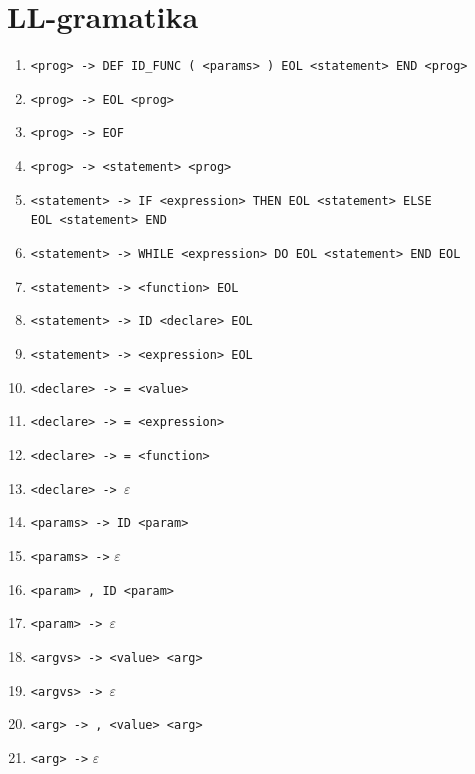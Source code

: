 \documentclass [11pt, a4paper]{article}
\begin{document}
\section{LL-gramatika}
\begin{table}[H]
	\centering
    \begin{enumerate}[noitemsep]
        \item \verb|<prog> -> DEF ID_FUNC ( <params> ) EOL <statement> END <prog>|
        \item \verb|<prog> -> EOL <prog>|
        \item \verb|<prog> -> EOF|
        \item \verb|<prog> -> <statement> <prog>|
        
        \item \verb|<statement> -> IF <expression> THEN EOL <statement> ELSE| \\ 
\verb|EOL <statement> END|
        \item \verb|<statement> -> WHILE <expression> DO EOL <statement> END EOL|
        \item \verb|<statement> -> <function> EOL|
        \item \verb|<statement> -> ID <declare> EOL|
	\item \verb|<statement> -> <expression> EOL|
        
        \item \verb|<declare> -> = <value>|
        \item \verb|<declare> -> = <expression>|
        \item \verb|<declare> -> = <function>|
        \item \verb|<declare> -> |$\varepsilon$
        
        \item \verb|<params> -> ID <param>|
        \item \verb|<params> ->| $\varepsilon$
        
        \item \verb|<param> , ID <param>|
        \item \verb|<param> -> |$\varepsilon$
    
        \item \verb|<argvs> -> <value> <arg>|
        \item \verb|<argvs> -> |$\varepsilon$
        
        \item \verb|<arg> -> , <value> <arg>|
        \item \verb|<arg> ->| $\varepsilon$
        

\end{enumerate}
\end{table}
\end{document}
